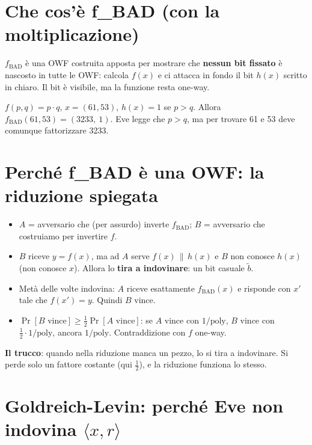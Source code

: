 \section{Che cos'è f\_BAD (con la moltiplicazione)}

\begin{inbreve}
\(f_{\text{BAD}}\) è una OWF costruita apposta per mostrare che \textbf{nessun bit fissato} è nascosto in tutte le OWF: calcola \(f(x)\) e ci attacca in fondo il bit \(h(x)\) scritto in chiaro. Il bit è visibile, ma la funzione resta one-way.
\end{inbreve}

\begin{esempio}
\(f(p, q) = p \cdot q\), \(x = (61, 53)\), \(h(x) = 1\) se \(p > q\). Allora \(f_{\text{BAD}}(61, 53) = (3233,\ 1)\). Eve legge che \(p > q\), ma per trovare 61 e 53 deve comunque fattorizzare 3233.
\end{esempio}

\section{Perché f\_BAD è una OWF: la riduzione spiegata}

\begin{itemize}
  \item \(A\) = avversario che (per assurdo) inverte \(f_{\text{BAD}}\); \(B\) = avversario che costruiamo per invertire \(f\).
  \item \(B\) riceve \(y = f(x)\), ma ad \(A\) serve \(f(x) \,\|\, h(x)\) e \(B\) non conosce \(h(x)\) (non conosce \(x\)). Allora lo \textbf{tira a indovinare}: un bit casuale \(\tilde{b}\).
  \item Metà delle volte indovina: \(A\) riceve esattamente \(f_{\text{BAD}}(x)\) e risponde con \(x'\) tale che \(f(x') = y\). Quindi \(B\) vince.
  \item \(\Pr[B \text{ vince}] \ge \frac{1}{2} \Pr[A \text{ vince}]\): se \(A\) vince con \(1/\text{poly}\), \(B\) vince con \(\frac{1}{2} \cdot 1/\text{poly}\), ancora \(1/\text{poly}\). Contraddizione con \(f\) one-way.
\end{itemize}

\begin{nota}
\textbf{Il trucco}: quando nella riduzione manca un pezzo, lo si tira a indovinare. Si perde solo un fattore costante (qui \(\frac{1}{2}\)), e la riduzione funziona lo stesso.
\end{nota}

\section{Goldreich-Levin: perché Eve non indovina \texorpdfstring{\(\langle x, r \rangle\)}{<x,r>}}

